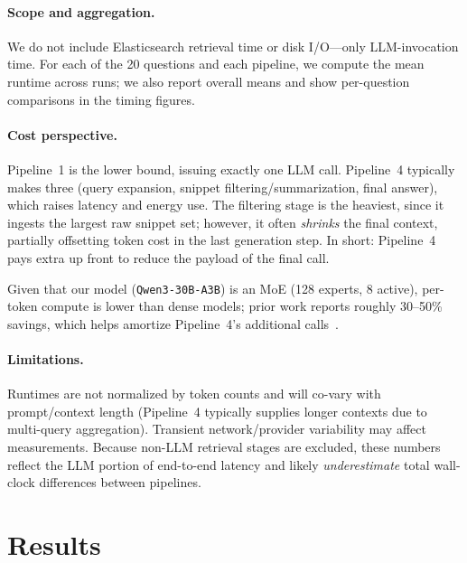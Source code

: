 \documentclass[manuscript,screen]{acmart}
\begin{document}
\begin{CCSXML}
	\paragraph{Scope and aggregation.}
	We do not include Elasticsearch retrieval time or disk I/O—only LLM-invocation time. For each
	of the 20 questions and each pipeline, we compute the mean runtime across runs; we also report
	overall means and show per-question comparisons in the timing figures.
	
	\paragraph{Cost perspective.}
	\label{cost-perspective}
	Pipeline~1 is the lower bound, issuing exactly one LLM call. Pipeline~4 typically makes three (query expansion, snippet filtering/summarization, final answer), which raises latency and energy use. The filtering stage is the heaviest, since it ingests the largest raw snippet set; however, it often \emph{shrinks} the final context, partially offsetting token cost in the last generation step. In short: Pipeline~4 pays extra up front to reduce the payload of the final call.
	
	Given that our model (\texttt{Qwen3-30B-A3B}) is an MoE (128 experts, 8 active), per-token compute is lower than dense models; prior work reports roughly 30–50\% savings, which helps amortize Pipeline~4’s additional calls~\cite{qwen3_model,yun2024inferenceoptimalmixtureofexpertlargelanguage}.

	
	\paragraph{Limitations.}
	Runtimes are not normalized by token counts and will co-vary with prompt/context length
	(Pipeline~4 typically supplies longer contexts due to multi-query aggregation). Transient
	network/provider variability may affect measurements. Because non-LLM retrieval stages are
	excluded, these numbers reflect the LLM portion of end-to-end latency and likely
	\emph{underestimate} total wall-clock differences between pipelines.

	
\section{Results}
\label{sec:results}
	

\end{CCSXML}
\end{document}

